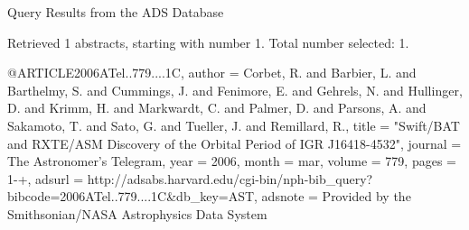 Query Results from the ADS Database


Retrieved 1 abstracts, starting with number 1.  Total number selected: 1.

@ARTICLE{2006ATel..779....1C,
   author = {{Corbet}, R. and {Barbier}, L. and {Barthelmy}, S. and {Cummings}, J. and 
	{Fenimore}, E. and {Gehrels}, N. and {Hullinger}, D. and {Krimm}, H. and 
	{Markwardt}, C. and {Palmer}, D. and {Parsons}, A. and {Sakamoto}, T. and 
	{Sato}, G. and {Tueller}, J. and {Remillard}, R.},
    title = "{Swift/BAT and RXTE/ASM Discovery of the Orbital Period of IGR J16418-4532}",
  journal = {The Astronomer's Telegram},
     year = 2006,
    month = mar,
   volume = 779,
    pages = {1-+},
   adsurl = {http://adsabs.harvard.edu/cgi-bin/nph-bib_query?bibcode=2006ATel..779....1C&db_key=AST},
  adsnote = {Provided by the Smithsonian/NASA Astrophysics Data System}
}


